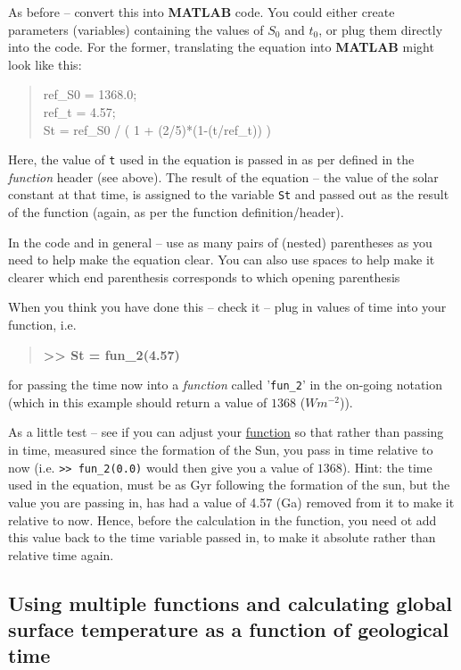 \documentclass{tufte-book} %
\newenvironment{docspec}{\begin{quotation}\ttfamily\parskip0pt\parindent0pt\ignorespaces}{\end{quotation}}
\newenvironment{docspecbold}{\begin{quotation}\ttfamily\bfseries\parskip0pt\parindent0pt\ignorespaces}{\end{quotation}}
\begin{document}
As before -- convert this into \textbf{MATLAB} code. You could either create parameters (variables) containing the values of \(S_{0}\) and \(t_{0}\), or plug them directly into the code. For the former, translating the equation into \textbf{MATLAB} might look like this:
\begin{docspec}
ref\_S0 = 1368.0;\\
ref\_t = 4.57;\\
St = ref\_S0 / ( 1 + (2/5)*(1-(t/ref\_t)) )
\end{docspec}
Here, the value of \texttt{t} used in the equation is passed in as per defined in the \textit{function} header (see above). The result of the equation -- the value of the solar constant at that time, is assigned to the variable \texttt{St} and passed out as the result of the function (again, as per the function definition/header).

In the code and in general -- use as many pairs of (nested) parentheses as you need to help make the equation clear. You can also use spaces to help make it clearer which end parenthesis corresponds to which opening parenthesis

When you think you have done this -- check it -- plug in values of time into your function, i.e.
\begin{docspecbold}
>> St = fun\_2(4.57)
\end{docspecbold}
for passing the time now into a \textit{function} called '\texttt{fun\_2}' in the on-going notation (which in this example should return a value of \(1368\) (\(Wm^{-2}\))).

As a little test -- see if you can adjust your \uline{function} so that rather than passing in time, measured since the formation of the Sun, you pass in time relative to now (i.e. \texttt{>> fun\_2(0.0)} would then give you a value of \(1368\)).
Hint: the time used in the equation, must be as Gyr following the formation of the sun, but the value you are passing in, has had a value of 4.57 (Ga) removed from it to make it relative to now. Hence, before the calculation in the function, you need ot add this value back to the time variable passed in, to make it absolute rather than relative time again.


\subsection{Using multiple functions and calculating global surface temperature as a function of geological time}
\end{document}
